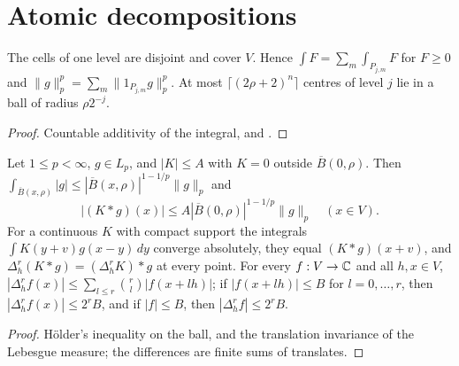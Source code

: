 \section{Atomic decompositions}
\label{sec:rd-atomic-decompositions}

\begin{lemma}
\label{lem:cells-partition}
\leanok
{}
The cells of one level are disjoint and cover $V$. Hence $\int F = \sum_m \int_{P_{j,m}} F$ for
$F \geq 0$ and $\|g\|_p^p = \sum_m \|1_{P_{j,m}} g\|_p^p$. At most
$\lceil (2\rho + 2)^n \rceil$ centres of level $j$ lie in a ball of radius $\rho 2^{-j}$.
\end{lemma}

\begin{proof}
\leanok
Countable additivity of the integral, and .
\end{proof}

\begin{lemma}
\label{lem:conv-pointwise}
\leanok
{}
Let $1 \leq p < \infty$, $g \in L_p$, and $|K| \leq A$ with $K = 0$ outside $\overline{B}(0, \rho)$.
Then $\int_{\overline{B}(x, \rho)} |g| \leq |\overline{B}(x, \rho)|^{1 - 1/p} \|g\|_p$ and
\[
  |(K * g)(x)| \leq A |\overline{B}(0, \rho)|^{1-1/p} \|g\|_p \quad (x \in V).
\]
For a continuous $K$ with compact support the integrals $\int K(y + v) g(x - y) \, dy$ converge
absolutely, they equal $(K * g)(x + v)$, and $\Delta_h^r (K * g) = (\Delta_h^r K) * g$ at every point.
For every $f : V \to \mathbb{C}$ and all $h, x \in V$,
$|\Delta_h^r f(x)| \leq \sum_{l \leq r} \binom{r}{l} |f(x + l h)|$; if $|f(x + l h)| \leq B$
for $l = 0, \dots, r$, then $|\Delta_h^r f(x)| \leq 2^r B$, and if $|f| \leq B$, then
$|\Delta_h^r f| \leq 2^r B$.
\end{lemma}

\begin{proof}
\leanok
H\"older's inequality on the ball, and the translation invariance of the Lebesgue measure; the
differences are finite sums of translates.
\end{proof}

